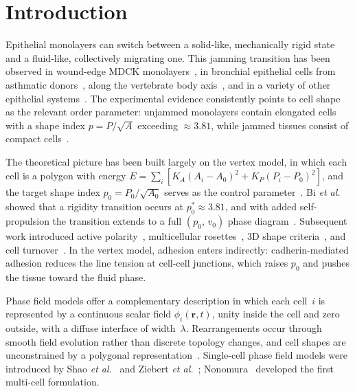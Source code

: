 \documentclass[aps,pre,twocolumn,superscriptaddress,longbibliography]{revtex4-2}
\newcommand{\phii}{\phi_i}                 %
\begin{document}
\section{Introduction}
\label{sec:intro}

Epithelial monolayers can switch between a solid-like, mechanically rigid
state and a fluid-like, collectively migrating one.  This jamming transition
has been observed in wound-edge MDCK
monolayers~\cite{Angelini2011,Garcia2015}, in bronchial epithelial cells
from asthmatic donors~\cite{Park2015}, along the vertebrate body
axis~\cite{Mongera2018}, and in a variety of other epithelial
systems~\cite{Atia2018,Malinverno2017}.  The experimental evidence
consistently points to cell shape as the relevant order parameter: unjammed
monolayers contain elongated cells with a shape index $p = P/\sqrt{A}$
exceeding $\approx 3.81$, while jammed tissues consist of compact
cells~\cite{Park2015,Atia2018}.

The theoretical picture has been built largely on the vertex model, in
which each cell is a polygon with energy
$E = \sum_i[K_A(A_i - A_0)^2 + K_P(P_i - P_0)^2]$, and the target shape
index $p_0 = P_0/\sqrt{A_0}$ serves as the control
parameter~\cite{NagaiHonda2001,Farhadifar2007,Staple2010,Fletcher2014}.
Bi \textit{et al.}~\cite{Bi2015} showed that a rigidity transition occurs at
$p_0^* \approx 3.81$, and with added self-propulsion the transition extends
to a full $(p_0,\,v_0)$ phase diagram~\cite{Bi2016}.  Subsequent work
introduced active polarity~\cite{Barton2017}, multicellular
rosettes~\cite{YanBi2019}, 3D shape criteria~\cite{MerkelManning2018},
and cell turnover~\cite{Czajkowski2019}.  In the vertex model, adhesion
enters indirectly: cadherin-mediated adhesion reduces the line tension at
cell-cell junctions, which raises $p_0$ and pushes the tissue toward the
fluid phase.

Phase field models offer a complementary description in which each cell~$i$
is represented by a continuous scalar field $\phii(\bm{r},t)$, unity inside
the cell and zero outside, with a diffuse interface of width~$\lambda$.
Rearrangements occur through smooth field evolution rather than discrete
topology changes, and cell shapes are unconstrained by a polygonal
representation~\cite{Camley2017,AlertTrepat2020}.  Single-cell phase field
models were introduced by Shao \textit{et al.}~\cite{Shao2010} and Ziebert
\textit{et al.}~\cite{Ziebert2012}; Nonomura~\cite{Nonomura2012} developed
the first multi-cell formulation.
\end{document}
